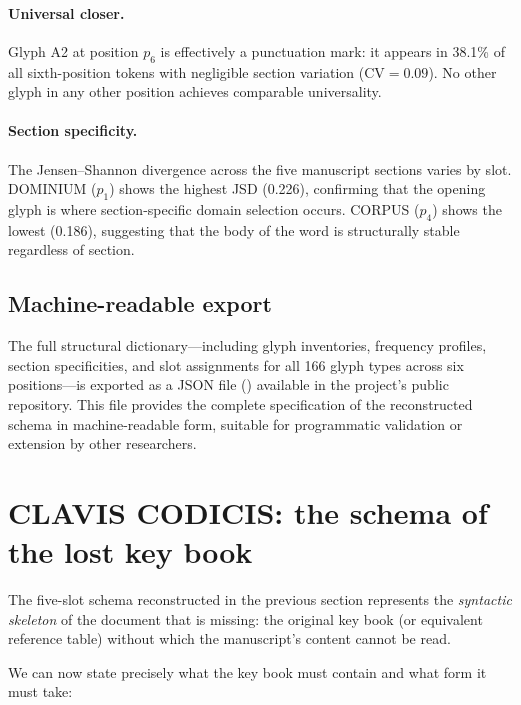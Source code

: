 \paragraph{Universal closer.}
Glyph A2 at position $p_6$ is effectively a punctuation mark: it
appears in 38.1\% of all sixth-position tokens with negligible
section variation ($\text{CV} = 0.09$). No other glyph in any other
position achieves comparable universality.

\paragraph{Section specificity.}
The Jensen--Shannon divergence across the five manuscript sections
varies by slot. DOMINIUM ($p_1$) shows the highest JSD (0.226),
confirming that the opening glyph is where section-specific domain
selection occurs. CORPUS ($p_4$) shows the lowest (0.186), suggesting
that the body of the word is structurally stable regardless of section.

\subsection{Machine-readable export}

The full structural dictionary---including glyph inventories, frequency
profiles, section specificities, and slot assignments for all 166 glyph
types across six positions---is exported as a JSON file
() available in the
project's public repository. This file provides the complete
specification of the reconstructed schema in machine-readable form,
suitable for programmatic validation or extension by other researchers.


\section{CLAVIS CODICIS: the schema of the lost key book}
\label{sec:clavis}

The five-slot schema reconstructed in the previous section represents
the \emph{syntactic skeleton} of the document that is missing: the
original key book (or equivalent reference table) without which the
manuscript's content cannot be read.

We can now state precisely what the key book must contain and what
form it must take:

